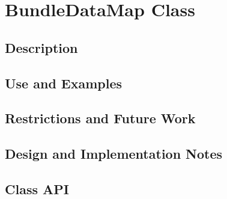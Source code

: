 \documentclass[]{article}
\begin{document}




\newpage
\tableofcontents

\newpage


\section{BundleDataMap Class}

\subsection{Description}






\subsection{Use and Examples}








\subsection{Restrictions and Future Work}






\subsection{Design and Implementation Notes}






\subsection{Class API}






%

%

% 
%
\end{document}
